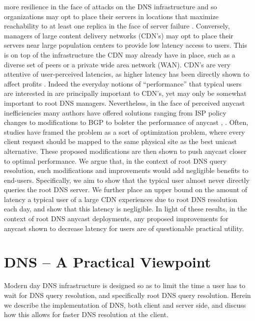\documentclass[sigconf,nonacm,10pt]{acmart}
\begin{document}
more resilience in the face of attacks on the DNS infrastructure and so
organizations may opt to place their servers in locations that maximize
reachability to at least one replica in the face of server failure
\cite{moura2016anycast}. Conversely, managers of large content delivery
networks (CDN's) may opt to place their servers near large population
centers to provide low latency access to users. This is on top of the
infrastructure the CDN may already have in place, such as a diverse set
of peers or a private wide area network (WAN). CDN's are very attentive
of user-perceived latencies, as higher latency has been directly shown
to affect profits \cite{linden}. Indeed the everyday notions of
``performance'' that typical users are interested in are principally
important to CDN's, yet may only be somewhat important to root DNS
managers. \break
Nevertheless, in the face of perceived anycast inefficiencies many
authors have offered solutions ranging from ISP policy changes to
modifications to BGP to bolster the performance of anycast
\cite{li_levin_spring_bhattacharjee_2018},
\cite{huawei_evaluating_anycast}. Often, studies have framed the problem
as a sort of optimization problem, where every client request should be
mapped to the same physical site as the best unicast alternative. These
proposed modifications are then shown to push anycast closer to optimal
performance. \break
We argue that, in the context of root DNS query resolution, such
modifications and improvements would add negligible benefits to
end-users. Specifically, we aim to show that the typical user almost
never directly queries the root DNS server. We further place an upper
bound on the amount of latency a typical user of a large CDN experiences
due to root DNS resolution each day, and show that this latency is
negligible. In light of these results, in the context of root DNS
anycast deployments, any proposed improvements for anycast shown to
decrease latency for users are of questionable practical utility. \break

\section{DNS -- A Practical
Viewpoint}\label{dns-a-practical-viewpoint-1}

Modern day DNS infrastructure is designed so as to limit the time a user
has to wait for DNS query resolution, and specifically root DNS query
resolution. Herein we describe the implementation of DNS, both client
and server side, and discuss how this allows for faster DNS resolution
at the client.
\end{document}
